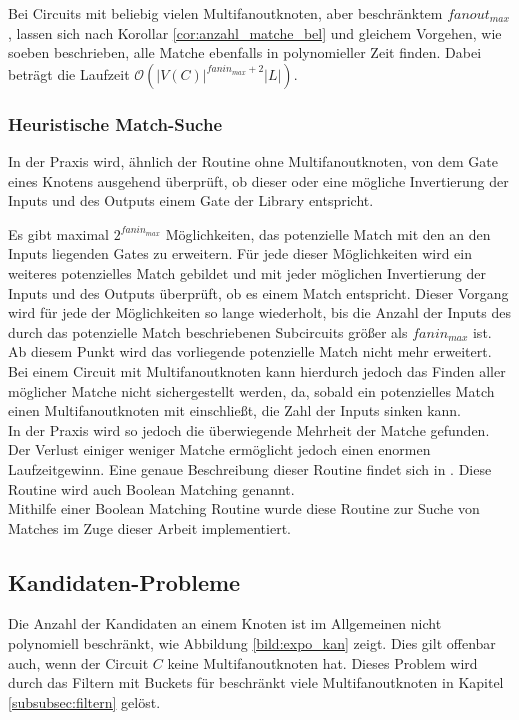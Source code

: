 \documentclass[11pt, a4paper, german]{article}
\begin{document}
Bei Circuits mit beliebig vielen Multifanoutknoten, aber beschränktem $fanout_{max}$, lassen sich nach Korollar \ref{cor:anzahl_matche_bel} und gleichem Vorgehen, wie soeben beschrieben, alle Matche ebenfalls in polynomieller Zeit finden. Dabei beträgt die Laufzeit $\mathcal{O}(|V(C)|^{fanin_{max}+2}|L|)$.

\subsubsection{Heuristische Match-Suche}
In der Praxis wird, ähnlich der Routine ohne Multifanoutknoten, von dem Gate eines Knotens ausgehend überprüft, ob dieser oder eine mögliche Invertierung der Inputs und des Outputs einem Gate der Library entspricht. 

Es gibt maximal $2^{fanin_{max}}$ Möglichkeiten, das potenzielle Match mit den an den Inputs liegenden Gates zu erweitern. Für jede dieser Möglichkeiten wird ein weiteres potenzielles Match gebildet und mit jeder möglichen Invertierung der Inputs und des Outputs überprüft, ob es einem Match entspricht.
Dieser Vorgang wird für jede der Möglichkeiten so lange wiederholt, bis die Anzahl der Inputs des durch das potenzielle Match beschriebenen Subcircuits größer als $fanin_{max}$ ist. Ab diesem Punkt wird das vorliegende potenzielle Match nicht mehr erweitert. \\
Bei einem Circuit mit Multifanoutknoten kann hierdurch jedoch das Finden aller möglicher Matche nicht sichergestellt werden, da, sobald ein potenzielles Match einen Multifanoutknoten mit einschließt, die Zahl der Inputs sinken kann. \\
In der Praxis wird so jedoch die überwiegende Mehrheit der Matche gefunden. Der Verlust einiger weniger Matche ermöglicht jedoch einen enormen Laufzeitgewinn.
Eine genaue Beschreibung dieser Routine findet sich in \cite{BooleanMatching}. Diese Routine wird auch Boolean Matching genannt.\\
Mithilfe einer Boolean Matching Routine wurde diese Routine zur Suche von Matches im Zuge dieser Arbeit implementiert. 

\subsection{Kandidaten-Probleme}
\label{subsec:kand_prob}
Die Anzahl der Kandidaten an einem Knoten ist im Allgemeinen nicht polynomiell beschränkt, wie Abbildung \ref{bild:expo_kan} zeigt. Dies gilt offenbar auch, wenn der Circuit $C$ keine Multifanoutknoten hat. Dieses Problem wird durch das Filtern mit Buckets für beschränkt viele Multifanoutknoten in Kapitel \ref{subsubsec:filtern} gelöst.
\end{document}
